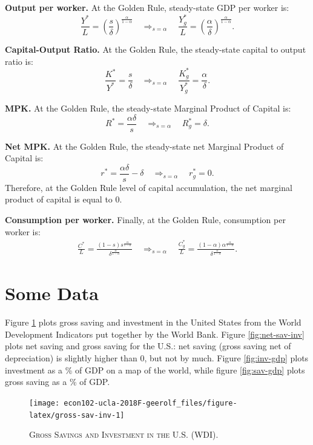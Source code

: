 \documentclass[]{book}
\theoremstyle{definition}
\theoremstyle{definition}
\theoremstyle{definition}
\theoremstyle{remark}
\begin{document}
\textbf{Output per worker.} At the Golden Rule, steady-state GDP per
worker is:
\[\frac{Y^{*}}{L}=\left(\frac{s}{\delta}\right)^{\frac{\alpha}{1-\alpha}}\quad\Rightarrow_{s=\alpha}\quad \boxed{\frac{Y^{*}_g}{L}=\left(\frac{\alpha}{\delta}\right)^{\frac{\alpha}{1-\alpha}}}.\]

\textbf{Capital-Output Ratio.} At the Golden Rule, the steady-state
capital to output ratio is:
\[\frac{K^{*}}{Y^{*}} = \frac{s}{\delta} \quad \Rightarrow_{s=\alpha} \quad \boxed{\frac{K^{*}_g}{Y^{*}_g} = \frac{\alpha}{\delta}}.\]

\textbf{MPK.} At the Golden Rule, the steady-state Marginal Product of
Capital is: \[
R^{*}=\frac{\alpha \delta}{s} \quad \Rightarrow_{s=\alpha} \quad \boxed{R^*_g = \delta}.
\]

\textbf{Net MPK.} At the Golden Rule, the steady-state net Marginal
Product of Capital is: \[
r^{*}=\frac{\alpha \delta}{s}-\delta \quad \Rightarrow_{s=\alpha} \quad \boxed{r^*_g = 0}.
\] Therefore, at the Golden Rule level of capital accumulation, the net
marginal product of capital is equal to 0.

\textbf{Consumption per worker.} Finally, at the Golden Rule,
consumption per worker is: \[
\begin{aligned}
\frac{C^{*}}{L}=\frac{(1-s)s^{\frac{\alpha}{1-\alpha}}}{\delta^{\frac{\alpha}{1-\alpha}}} \quad \Rightarrow_{s=\alpha} \quad \boxed{\frac{C^{*}_g}{L}=\frac{(1-\alpha)\alpha^{\frac{\alpha}{1-\alpha}}}{\delta^{\frac{\alpha}{1-\alpha}}}}.
\end{aligned}
\]

\section{Some Data}\label{some-data}

Figure \ref{fig:gross-sav-inv} plots gross saving and investment in the
United States from the World Development Indicators put together by the
World Bank. Figure \ref{fig:net-sav-inv} plots net saving and gross
saving for the U.S.: net saving (gross saving net of depreciation) is
slightly higher than 0, but not by much. Figure \ref{fig:inv-gdp} plots
investment as a \% of GDP on a map of the world, while figure
\ref{fig:sav-gdp} plots gross saving as a \% of GDP.




\begin{figure}

{\centering \texttt{[image: econ102-ucla-2018F-geerolf\_files/figure-latex/gross-sav-inv-1]} 

}

\caption{\textsc{Gross Savings and Investment in the
U.S. (WDI)}.}\label{fig:gross-sav-inv}
\end{figure}
\end{document}
